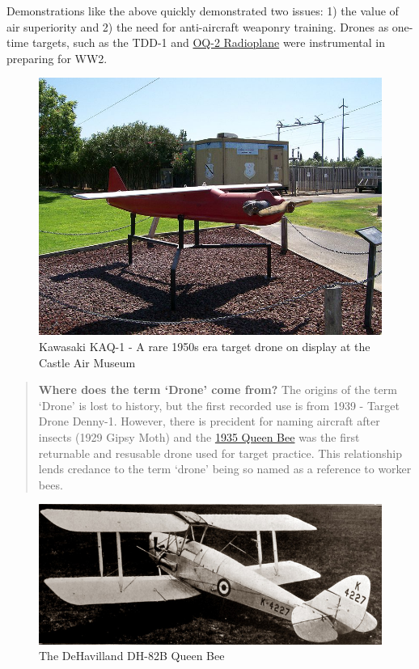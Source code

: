 \documentclass[
]{book}
\theoremstyle{definition}
\theoremstyle{definition}
\theoremstyle{definition}
\theoremstyle{remark}
\begin{document}
Demonstrations like the above quickly demonstrated two issues: 1) the value of air superiority and 2) the need for anti-aircraft weaponry training. Drones as one-time targets, such as the TDD-1 and \href{https://en.wikipedia.org/wiki/Radioplane_OQ-2}{OQ-2 Radioplane} were instrumental in preparing for WW2.

\begin{figure}

{\centering \includegraphics[width=0.5\linewidth]{images/history/KAQ-1_Drone} 

}

\caption{Kawasaki KAQ-1 - A rare 1950s era target drone on display at the Castle Air Museum}\label{fig:KAQ}
\end{figure}

\begin{quote}
\textbf{Where does the term `Drone' come from?} The origins of the term `Drone' is lost to history, but the first recorded use is from 1939 - Target Drone Denny-1. However, there is precident for naming aircraft after insects (1929 Gipsy Moth) and the \href{https://www.dehavillandmuseum.co.uk/aircraft/de-havilland-dh82b-queen-bee/}{1935 Queen Bee} was the first returnable and resusable drone used for target practice. This relationship lends credance to the term `drone' being so named as a reference to worker bees.
\end{quote}

\begin{figure}

{\centering \includegraphics[width=0.5\linewidth]{images/history/QueenBee} 

}

\caption{The DeHavilland DH-82B Queen Bee  }\label{fig:QueenBee}
\end{figure}
\end{document}
